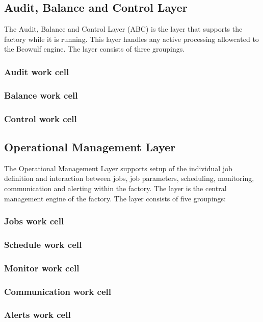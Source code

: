 \documentclass{sigplanconf}
\begin{document}
\subsection{Audit, Balance and Control Layer}
The Audit, Balance and Control Layer (ABC) is the layer that supports the factory while it is running.
This layer handles any active processing allowcated to the Beowulf engine. The layer consists of three groupings.
\subsubsection{Audit work cell}

\subsubsection{Balance work cell}

\subsubsection{Control work cell}

\subsection{Operational Management Layer}
The Operational Management Layer supports setup of the individual job definition and 
interaction between jobs, job parameters, scheduling, monitoring, communication and alerting within the factory. The layer is the central management engine of the factory. The layer consists of five groupings:
\subsubsection{Jobs work cell}

\subsubsection{Schedule work cell}

\subsubsection{Monitor work cell}

\subsubsection{Communication work cell}

\subsubsection{Alerts work cell}
\end{document}
